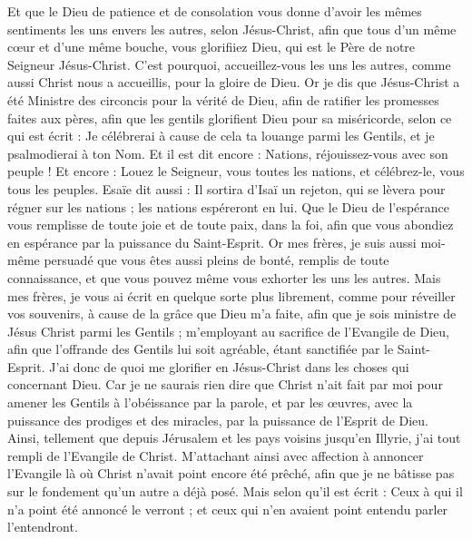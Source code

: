 \begin{multicols}{2}
Et que le Dieu de patience et de consolation vous donne d’avoir les mêmes sentiments les uns envers les autres, selon Jésus-Christ,
afin que tous d'un même cœur et d'une même bouche, vous glorifiiez Dieu, qui est le Père de notre Seigneur Jésus-Christ.
C'est pourquoi, accueillez-vous les uns les autres, comme aussi Christ nous a accueillis, pour la gloire de Dieu.
Or je dis que Jésus-Christ a été Ministre des circoncis pour la vérité de Dieu, afin de ratifier les promesses faites aux pères,
afin que les gentils glorifient Dieu pour sa miséricorde, selon ce qui est écrit : Je célébrerai à cause de cela ta louange parmi les Gentils, et je psalmodierai à ton Nom. Et il est dit encore :
Nations, réjouissez-vous avec son peuple !
Et encore : Louez le Seigneur, vous toutes les nations, et célébrez-le, vous tous les peuples. Esaïe dit aussi :
Il sortira d’Isaï un rejeton, qui se lèvera pour régner sur les nations ; les nations espéreront en lui.
Que le Dieu de l’espérance vous remplisse de toute joie et de toute paix, dans la foi, afin que vous abondiez en espérance par la puissance du Saint-Esprit.
 Or mes frères, je suis aussi moi-même persuadé que vous êtes aussi pleins de bonté, remplis de toute connaissance, et que vous pouvez même vous exhorter les uns les autres.
Mais mes frères, je vous ai écrit en quelque sorte plus librement, comme pour réveiller vos souvenirs, à cause de la grâce que Dieu m’a faite,
afin que je sois ministre de Jésus Christ parmi les Gentils ; m’employant au sacrifice de l’Evangile de Dieu, afin que l'offrande des Gentils lui soit agréable, étant sanctifiée par le Saint-Esprit.
J’ai donc de quoi me glorifier en Jésus-Christ dans les choses qui concernant Dieu.
Car je ne saurais rien dire que Christ n’ait fait par moi pour amener les Gentils à l’obéissance par la parole, et par les œuvres,
avec la puissance des prodiges et des miracles, par la puissance de l'Esprit de Dieu. Ainsi, tellement que depuis Jérusalem et les pays voisins jusqu’en Illyrie, j’ai tout rempli de l’Evangile de Christ.
M'attachant ainsi avec affection à annoncer l’Evangile là où Christ n’avait point encore été prêché, afin que je ne bâtisse pas sur le fondement qu'un autre a déjà posé. 
Mais selon qu'il est écrit : Ceux à qui il n'a point été annoncé le verront ; et ceux qui n'en avaient point entendu parler l’entendront.

\end{multicols}
